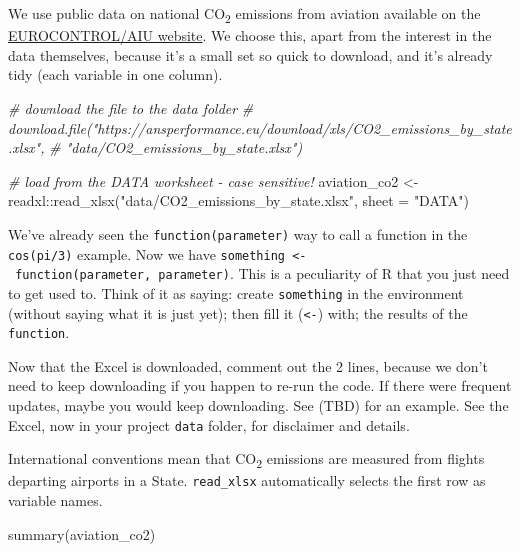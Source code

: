 \documentclass[
]{book}
\newenvironment{Shaded}{\begin{snugshade}}{\end{snugshade}}
\newcommand{\AttributeTok}[1]{\textcolor[rgb]{0.77,0.63,0.00}{#1}}
\newcommand{\CommentTok}[1]{\textcolor[rgb]{0.56,0.35,0.01}{\textit{#1}}}
\newcommand{\FunctionTok}[1]{\textcolor[rgb]{0.00,0.00,0.00}{#1}}
\newcommand{\NormalTok}[1]{#1}
\newcommand{\OtherTok}[1]{\textcolor[rgb]{0.56,0.35,0.01}{#1}}
\newcommand{\SpecialCharTok}[1]{\textcolor[rgb]{0.00,0.00,0.00}{#1}}
\newcommand{\StringTok}[1]{\textcolor[rgb]{0.31,0.60,0.02}{#1}}
\begin{document}
We use public data on national CO\textsubscript{2} emissions from aviation available on the \href{https://ansperformance.eu/data/}{EUROCONTROL/AIU website}. We choose this, apart from the interest in the data themselves, because it's a small set so quick to download, and it's already tidy (each variable in one column).

\begin{Shaded}
\begin{Highlighting}[]
\CommentTok{\# download the file to the data folder}
\CommentTok{\# download.file("https://ansperformance.eu/download/xls/CO2\_emissions\_by\_state.xlsx", }
\CommentTok{\#               "data/CO2\_emissions\_by\_state.xlsx")}

\CommentTok{\# load from the DATA worksheet {-} case sensitive!}
\NormalTok{aviation\_co2 }\OtherTok{\textless{}{-}}\NormalTok{ readxl}\SpecialCharTok{::}\FunctionTok{read\_xlsx}\NormalTok{(}\StringTok{"data/CO2\_emissions\_by\_state.xlsx"}\NormalTok{, }
                                  \AttributeTok{sheet =} \StringTok{"DATA"}\NormalTok{)}
\end{Highlighting}
\end{Shaded}

We've already seen the \texttt{function(parameter)} way to call a function in the \texttt{cos(pi/3)} example. Now we have \texttt{something\ \textless{}-\ function(parameter,\ parameter)}. This is a peculiarity of R that you just need to get used to. Think of it as saying: create \texttt{something} in the environment (without saying what it is just yet); then fill it (\texttt{\textless{}-}) with; the results of the \texttt{function}.

Now that the Excel is downloaded, comment out the 2 lines, because we don't need to keep downloading if you happen to re-run the code. If there were frequent updates, maybe you would keep downloading. See (TBD) for an example. See the Excel, now in your project \texttt{data} folder, for disclaimer and details.

International conventions mean that CO\textsubscript{2} emissions are measured from flights departing airports in a State. \texttt{read\_xlsx} automatically selects the first row as variable names.

\begin{Shaded}
\begin{Highlighting}[]
\FunctionTok{summary}\NormalTok{(aviation\_co2)}
\end{Highlighting}
\end{Shaded}
\end{document}
